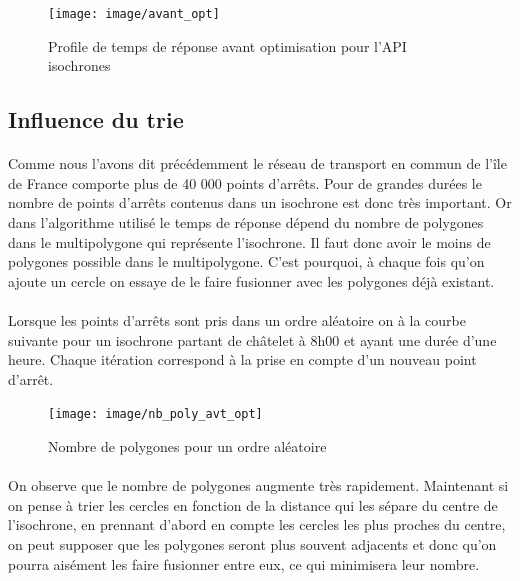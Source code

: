 \documentclass[a4paper]{report}
\begin{document}
\begin{figure}[H]
	\begin{center}
		\texttt{[image: image/avant\_opt]}
		\caption{Profile de temps de réponse avant optimisation pour l'API isochrones}
		\label{Profile de temps de réponse avant optimisation pour l'API isochrones}
	\end{center}
\end{figure}

\subsection{Influence du trie}

\paragraph{}Comme nous l'avons dit précédemment le réseau de transport en commun de l'île de France comporte plus de 40 000 points d'arrêts. Pour de grandes durées le nombre de points d'arrêts contenus dans un isochrone est donc très important. Or dans l'algorithme utilisé le temps de réponse dépend du nombre de polygones dans le multipolygone qui représente l'isochrone. Il faut donc avoir le moins de polygones possible dans le multipolygone. C'est pourquoi, à chaque fois qu'on ajoute un cercle on essaye de le faire fusionner avec les polygones déjà existant. 

\paragraph{} Lorsque les points d'arrêts sont pris dans un ordre aléatoire on à la courbe suivante pour un isochrone partant de châtelet à 8h00 et ayant une durée d'une heure. Chaque itération correspond à la prise en compte d'un nouveau point d'arrêt.

\begin{figure}[H]
	\begin{center}
		\texttt{[image: image/nb\_poly\_avt\_opt]}
		\caption{Nombre de polygones pour un ordre aléatoire}
		\label{Nombre de polygones pour un ordre aléatoire}
	\end{center}
\end{figure}

\paragraph{} On observe que le nombre de polygones augmente très rapidement. Maintenant si on pense à trier les cercles en fonction de la distance qui les sépare du centre de l'isochrone, en prennant d'abord en compte les cercles les plus proches du centre, on peut supposer que les polygones seront plus souvent adjacents et donc qu'on pourra aisément les faire fusionner entre eux, ce qui minimisera leur nombre. 
\end{document}
